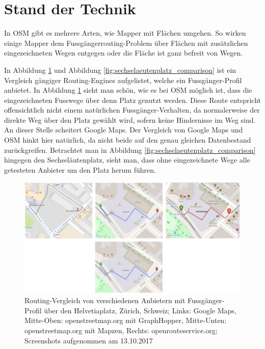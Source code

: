 \section{Stand der Technik}
\label{sec:Stand der Technik}

In \ac{OSM} gibt es mehrere Arten, wie Mapper mit Flächen umgehen. So wirken einige Mapper dem Fussgängerrouting-Problem über Flächen mit zusätzlichen eingezeichneten Wegen entgegen oder die Fläche ist ganz befreit von Wegen.

In Abbildung \ref{fig:helvetiaplatz_comparison} und Abbildung \ref{fig:sechselaeutenplatz_comparison} ist ein Vergleich gängiger Routing-Engines aufgelistet, welche ein Fussgänger-Profil anbietet. In Abbildung \ref{fig:helvetiaplatz_comparison} sieht man schön, wie es bei \ac{OSM} möglich ist, dass die eingezeichneten Fusswege über denn Platz genutzt werden. Diese Route entspricht offensichtlich nicht einem natürlichen Fussgänger-Verhalten, da normalerweise der direkte Weg über den Platz gewählt wird, sofern keine Hindernisse im Weg sind. An dieser Stelle scheitert Google Maps. Der Vergleich von Google Maps und \ac{OSM} hinkt hier natürlich, da nicht beide auf den genau gleichen Datenbestand zurückgreifen. Betrachtet man in Abbildung \ref{fig:sechselaeutenplatz_comparison} hingegen den Sechseläutenplatz, sieht man, dass ohne eingezeichnete Wege alle getesteten Anbieter um den Platz herum führen.

\begin{figure}[ht]
\centering
\includegraphics[width=1\linewidth]{technicalreport/img/helvetiaplatz_comparison}
\caption[Fussgänger-Routing Vergleich]{Routing-Vergleich von verschiedenen Anbietern mit Fussgänger-Profil über den Helvetiaplatz, Zürich, Schweiz; Links: Google Maps, Mitte-Oben: openstreetmap.org mit GraphHopper, Mitte-Unten: openstreetmap.org mit Mapzen, Rechts: openrouteservice.org; Screenshots aufgenommen am 13.10.2017}
\label{fig:helvetiaplatz_comparison}
\end{figure}

